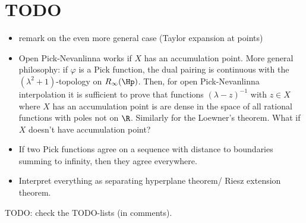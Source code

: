 \section{TODO}

\begin{itemize}
	\item remark on the even more general case (Taylor expansion at points)
	\item Open Pick-Nevanlinna works if $X$ has an accumulation point. More general philosophy: if $\varphi$ is a Pick function, the dual pairing is continuous with the $(\lambda^2 + 1)$-topology on $R_{\infty}(\Hp)$. Then, for open Pick-Nevanlinna interpolation it is sufficient to prove that functions $(\lambda - z)^{-1}$ with $z \in X$ where $X$ has an accumulation point is are dense in the space of all rational functions with poles not on $\R$. Similarly for the Loewner's theorem. What if $X$ doesn't have accumulation point?
	\item If two Pick functions agree on a sequence with distance to boundaries summing to infinity, then they agree everywhere.
	\item Interpret everything as separating hyperplane theorem/ Riesz extension theorem.
\end{itemize}

TODO: check the TODO-lists (in comments).

























